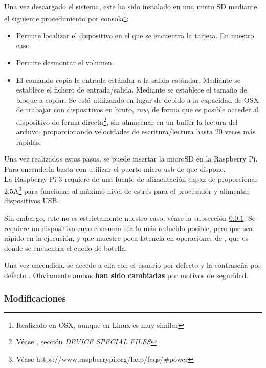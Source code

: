 Una vez descargado el sistema, este ha sido instalado en una micro SD mediante el siguiente procedimiento por consola\footnote{Realizado en OSX, aunque en Linux es muy similar}:
\begin{itemize}
\item{} Permite localizar el dispositivo en el que se encuentra la tarjeta. En nuestro caso 
\item{} Permite desmontar el volumen. 
\item{} El comando  copia la entrada estándar a la salida estándar. Mediante  se establece el fichero de entrada/salida. Mediante  se establece el tamaño de bloque a copiar. Se está utilizando  en lugar de  debido a la capacidad de OSX de trabajar con dispositivos en bruto, \textit{raw}, de forma que es posible acceder al dispositivo de forma directa\footnote{Véase , sección \textit{DEVICE SPECIAL FILES}}, sin almacenar en un buffer la lectura del archivo, proporcionando velocidades de escritura/lectura hasta 20 veces más rápidas.
\end{itemize}


Una vez realizados estos pasos, se puede insertar la microSD en la Raspberry Pi. Para encenderla basta con utilizar el puerto micro-usb de que dispone.\\La Raspberry Pi 3 requiere de una fuente de alimentación capaz de proporcionar 2,5A\footnote{Véase https://www.raspberrypi.org/help/faqs/\#power} para funcionar al máximo nivel de estrés para el procesador y alimentar dispositivos USB.

Sin embargo, este no es estrictamente nuestro caso, véase la subsección \ref{subsubsec:Modificaciones}. Se requiere un dispositivo cuyo consumo sea lo más reducido posible, pero que sea rápido en la ejecución, y que muestre poca latencia en operaciones de , que es donde se encuentra el cuello de botella.

Una vez encendida, se accede a ella con el usuario por defecto  y la contraseña por defecto . Obviamente ambas \textbf{han sido cambiadas} por motivos de seguridad.



\subsubsection{Modificaciones}
\label{subsubsec:Modificaciones}

